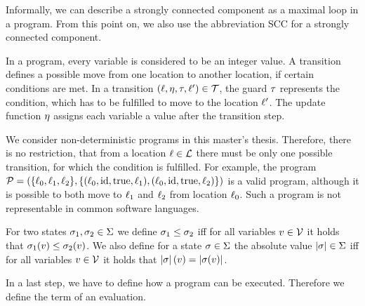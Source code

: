 Informally, we can describe a strongly connected component as a maximal loop in a program.
From this point on, we also use the abbreviation SCC for a strongly connected component.

In a program, every variable is considered to be an integer value.
A transition defines a possible move from one location to another location, if certain conditions are met.
In a transition $(\ell,\eta,\tau,\ell') \in \mathcal{T}$, the guard $\tau$ represents the condition, which has to be fulfilled to move to the location $\ell'$.
The update function $\eta$ assigns each variable a value after the transition step.

We consider non-deterministic programs in this master's thesis.
Therefore, there is no restriction, that from a location $\ell \in \mathcal{L}$ there must be only one possible transition, for which the condition is fulfilled.
For example, the program $\mathcal{P} = (\lbrace \ell_0,\ell_1,\ell_2 \rbrace,\lbrace (\ell_0,\text{id},\text{true},\ell_1),(\ell_0,\text{id},\text{true},\ell_2) \rbrace)$ is a valid program, although it is possible to both move to $\ell_1$ and $\ell_2$ from location $\ell_0$.
Such a program is not representable in common software languages.

For two states $\sigma_1, \sigma_2 \in \Sigma$ we define $\sigma_1 \leq \sigma_2$ iff for all variables $v \in \mathcal{V}$ it holds that $\sigma_1(v) \leq \sigma_2(v)$.
We also define for a state $\sigma \in \Sigma$ the absolute value $\left|\sigma\right| \in \Sigma$ iff for all variables $v \in \mathcal{V}$ it holds that $\left|\sigma\right|(v) = \left|\sigma(v)\right|$.

In a last step, we have to define how a program can be executed.
Therefore we define the term of an evaluation.


